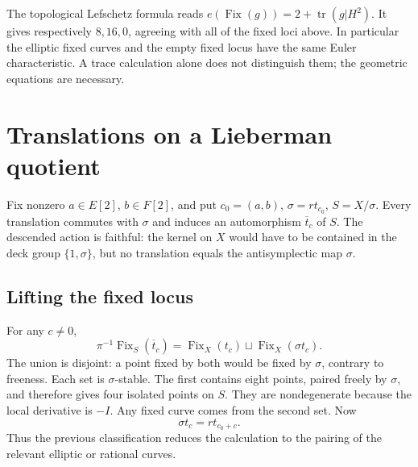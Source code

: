 \documentclass[11pt]{amsart}
\theoremstyle{definition}
\newcommand{\Fix}{\operatorname{Fix}}\newcommand{\NS}{\operatorname{NS}}
\newcommand{\tr}{\operatorname{tr}}\newcommand{\id}{\mathrm{id}}
\begin{document}
The topological Lefschetz formula reads $e(\Fix(g))=2+\tr(g|H^2)$.
It gives respectively $8,16,0$, agreeing with all of the fixed loci
above. In particular the elliptic fixed curves and the empty fixed
locus have the same Euler characteristic. A trace calculation alone
does not distinguish them; the geometric equations are necessary.

\section{Translations on a Lieberman quotient}\label{sec:descent}
Fix nonzero $a\in E[2]$, $b\in F[2]$, and put $c_0=(a,b)$,
$\sigma=rt_{c_0}$, $S=X/\sigma$. Every translation commutes with
$\sigma$ and induces an automorphism $\overline t_c$ of $S$.
The descended action is faithful: the kernel on $X$ would have to be
contained in the deck group $\{1,\sigma\}$, but no translation equals
the antisymplectic map $\sigma$.

\subsection{Lifting the fixed locus}
For any $c\ne0$,
\begin{equation}\label{eq:fixedlift}
 \pi^{-1}\Fix_S(\overline t_c)
       =\Fix_X(t_c)\sqcup\Fix_X(\sigma t_c).
\end{equation}
The union is disjoint: a point fixed by both would be fixed by
$\sigma$, contrary to freeness. Each set is $\sigma$-stable. The
first contains eight points, paired freely by $\sigma$, and therefore
gives four isolated points on $S$. They are nondegenerate because the
local derivative is $-I$. Any fixed curve comes from the second set.
Now
\[
 \sigma t_c=rt_{c_0+c}.
\]
Thus the previous classification reduces the calculation to the
pairing of the relevant elliptic or rational curves.
\end{document}

